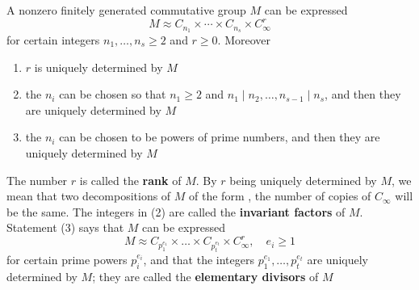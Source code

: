 \documentclass[11pt]{article}
\begin{document}
\begin{theorem}[]
A nonzero finitely generated commutative group \(M\) can be expressed
\begin{equation*}
M\approx C_{n_1}\times\cdots\times C_{n_s}\times C_\infty^r
\end{equation*}
for certain integers \(n_1,\dots,n_s\ge 2\) and \(r\ge 0\). Moreover
\begin{enumerate}
\item \(r\) is uniquely determined by \(M\)
\item the \(n_i\) can be chosen so that \(n_1\ge 2\) and \(n_1\mid n_2,\dots,n_{s-1}\mid n_s\), and then they are
uniquely determined by \(M\)
\item the \(n_i\) can be chosen to be powers of prime numbers, and then they are uniquely determined
by \(M\)
\end{enumerate}
\end{theorem}

The number \(r\) is called the \textbf{rank} of \(M\). By \(r\) being uniquely determined by \(M\), we
mean that two decompositions of \(M\) of the form , the number of copies of \(C_\infty\) will be the
same. The integers in (2) are called the \textbf{invariant factors} of \(M\). Statement (3) says
that \(M\) can be expressed
\begin{equation*}
M\approx C_{p_1^{e_1}}\times\dots\times C_{p_t^{e_t}}\times C_\infty^r,\quad e_i\ge 1
\end{equation*}
for certain prime powers \(p_i^{e_i}\), and that the integers \(p_1^{e_1},\dots,p_t^{e_t}\) are uniquely
determined by \(M\); they are called the \textbf{elementary divisors} of \(M\)
\end{document}
